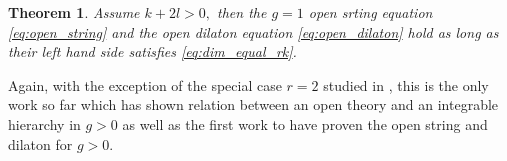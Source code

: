\documentclass[11pt]{amsart}
\newtheorem{thm}[dummy]{Theorem}
\theoremstyle{definition}
\theoremstyle{remark}
\newcommand{\<}{\left<}
\renewcommand{\>}{\right>}
\numberwithin{equation}{section}
\begin{document}
\begin{thm}\label{thm:open_string_dilaton}
Assume $k+2l>0,$ then the %
$g=1$ open srting equation %
\eqref{eq:open_string} and %
the open dilaton equation %
\eqref{eq:open_dilaton} hold as long as their left hand side %
satisfies \eqref{eq:dim_equal_rk}.
\end{thm}
Again, with the exception of the special case $r=2$ studied in \cite{Tes2,BT17}, this is %
the only work so far which has shown relation between an open theory and an integrable hierarchy %
in $g>0$ as %
well as the first work to have proven the open string and dilaton for $g>0.$
\end{document}
